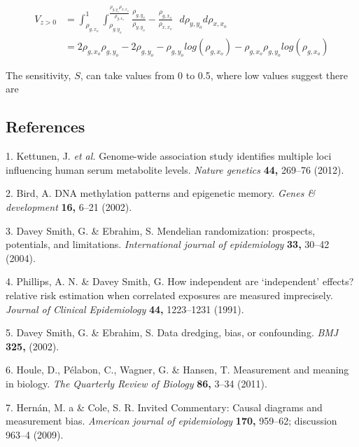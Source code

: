 \documentclass[]{article}
\begin{document}
\[
\begin{aligned}
V_{z>0} & = \int^1_{\rho_{g,x_o}} \int^{\frac{\rho_{g,y_o}\rho_{x,x_o}}{\rho_{g,x_o}}}_{\rho_{g,y_o}} \frac{\rho_{g,y_o}}{\rho_{y,y_o}} - \frac{\rho_{g,x_o}}{\rho_{x,x_o}}\,\,\,\, d\rho_{y,y_o}d\rho_{x,x_o} \\
& = 2\rho_{g,x_o}\rho_{g,y_o} - 2\rho_{g,y_o} - \rho_{g,y_o}log(\rho_{g,x_o}) - \rho_{g,x_o}\rho_{g,y_o}log(\rho_{g,x_o})
\end{aligned}
\]

The sensitivity, \(S\), can take values from 0 to 0.5, where low values
suggest there are

\newpage

\subsection*{References}\label{references}

\hypertarget{refs}{}
\hypertarget{ref-Kettunen2012}{}
1. Kettunen, J. \emph{et al.} Genome-wide association study identifies
multiple loci influencing human serum metabolite levels. \emph{Nature
genetics} \textbf{44,} 269--76 (2012).

\hypertarget{ref-Bird2002}{}
2. Bird, A. DNA methylation patterns and epigenetic memory. \emph{Genes
\& development} \textbf{16,} 6--21 (2002).

\hypertarget{ref-DaveySmith2004}{}
3. Davey Smith, G. \& Ebrahim, S. Mendelian randomization: prospects,
potentials, and limitations. \emph{International journal of
epidemiology} \textbf{33,} 30--42 (2004).

\hypertarget{ref-Phillips1991}{}
4. Phillips, A. N. \& Davey Smith, G. How independent are `independent'
effects? relative risk estimation when correlated exposures are measured
imprecisely. \emph{Journal of Clinical Epidemiology} \textbf{44,}
1223--1231 (1991).

\hypertarget{ref-DaveySmith2002}{}
5. Davey Smith, G. \& Ebrahim, S. Data dredging, bias, or confounding.
\emph{BMJ} \textbf{325,} (2002).

\hypertarget{ref-Houle2011}{}
6. Houle, D., Pélabon, C., Wagner, G. \& Hansen, T. Measurement and
meaning in biology. \emph{The Quarterly Review of Biology} \textbf{86,}
3--34 (2011).

\hypertarget{ref-Hernan2009}{}
7. Hernán, M. a \& Cole, S. R. Invited Commentary: Causal diagrams and
measurement bias. \emph{American journal of epidemiology} \textbf{170,}
959--62; discussion 963--4 (2009).
\end{document}
